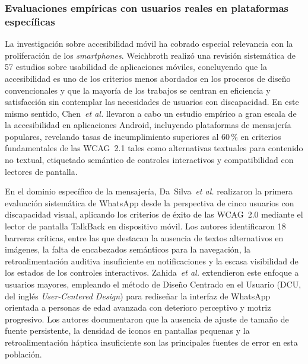 \documentclass[journal]{IEEEtran}
\begin{document}
			\subsubsection{Evaluaciones emp\'iricas con usuarios reales en plataformas espec\'ificas}
				La investigaci\'on sobre accesibilidad m\'ovil ha cobrado especial relevancia con la proliferaci\'on de los \textit{smartphones}. Weichbroth \cite{weichbroth2020} realiz\'o una revisi\'on sistem\'atica de 57 estudios sobre usabilidad de aplicaciones m\'oviles, concluyendo que la accesibilidad es uno de los criterios menos abordados en los procesos de dise\~no convencionales y que la mayor\'ia de los trabajos se centran en eficiencia y satisfacci\'on sin contemplar las necesidades de usuarios con discapacidad. En este mismo sentido, Chen~\textit{et al.} \cite{chen2022} llevaron a cabo un estudio emp\'irico a gran escala de la accesibilidad en aplicaciones Android, incluyendo plataformas de mensajer\'ia populares, revelando tasas de incumplimiento superiores al 60\,\% en criterios fundamentales de las WCAG~2.1 tales como alternativas textuales para contenido no textual, etiquetado sem\'antico de controles interactivos y compatibilidad con lectores de pantalla.
				
				En el dominio espec\'ifico de la mensajer\'ia, Da~Silva~\textit{et al.} \cite{dasilva2016} realizaron la primera evaluaci\'on sistem\'atica de WhatsApp desde la perspectiva de cinco usuarios con discapacidad visual, aplicando los criterios de \'exito de las WCAG~2.0 mediante el lector de pantalla TalkBack en dispositivo m\'ovil. Los autores identificaron 18 barreras cr\'iticas, entre las que destacan la ausencia de textos alternativos en im\'agenes, la falta de encabezados sem\'anticos para la navegaci\'on, la retroalimentaci\'on auditiva insuficiente en notificaciones y la escasa visibilidad de los estados de los controles interactivos. Zahida~\textit{et al.} \cite{zahida2021} extendieron este enfoque a usuarios mayores, empleando el m\'etodo de Dise\~no Centrado en el Usuario (DCU, del ingl\'es \textit{User-Centered Design}) para redise\~nar la interfaz de WhatsApp orientada a personas de edad avanzada con deterioro perceptivo y motriz progresivo. Los autores documentaron que la ausencia de ajuste de tama\~no de fuente persistente, la densidad de iconos en pantallas pequenas y la retroalimentaci\'on h\'aptica insuficiente son las principales fuentes de error en esta poblaci\'on.
				
\end{document}
